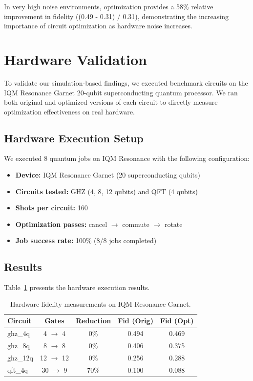 \documentclass[journal]{IEEEtran}
\begin{document}
In very high noise environments, optimization provides a 58\% relative improvement in fidelity ((0.49 - 0.31) / 0.31), demonstrating the increasing importance of circuit optimization as hardware noise increases.

\section{Hardware Validation}
\label{sec:hardware}

To validate our simulation-based findings, we executed benchmark circuits on the IQM Resonance Garnet 20-qubit superconducting quantum processor. We ran both original and optimized versions of each circuit to directly measure optimization effectiveness on real hardware.

\subsection{Hardware Execution Setup}

We executed 8 quantum jobs on IQM Resonance with the following configuration:
\begin{itemize}
    \item \textbf{Device:} IQM Resonance Garnet (20 superconducting qubits)
    \item \textbf{Circuits tested:} GHZ (4, 8, 12 qubits) and QFT (4 qubits)
    \item \textbf{Shots per circuit:} 160
    \item \textbf{Optimization passes:} cancel $\rightarrow$ commute $\rightarrow$ rotate
    \item \textbf{Job success rate:} 100\% (8/8 jobs completed)
\end{itemize}

\subsection{Results}

Table~\ref{tab:hw_results} presents the hardware execution results.

\begin{table}[t]
\caption{Hardware fidelity measurements on IQM Resonance Garnet.}
\label{tab:hw_results}
\centering
\begin{tabular}{lcccc}
\hline
Circuit & Gates & Reduction & Fid (Orig) & Fid (Opt) \\
\hline
ghz\_4q & 4 $\rightarrow$ 4 & 0\% & 0.494 & 0.469 \\
ghz\_8q & 8 $\rightarrow$ 8 & 0\% & 0.406 & 0.375 \\
ghz\_12q & 12 $\rightarrow$ 12 & 0\% & 0.256 & 0.288 \\
qft\_4q & 30 $\rightarrow$ 9 & 70\% & 0.100 & 0.088 \\
\hline
\end{tabular}
\end{table}
\end{document}
